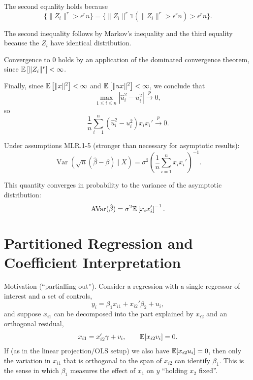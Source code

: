 \begin{remark}	The second equality holds because \[
		\{\|Z_i\|^r > \epsilon^r n\} = \{\|Z_i\|^r \mathds{1}(\|Z_i\|^r > \epsilon^r n) > \epsilon^r n\}
	.\] 
	
	The second inequality follows by Markov's inequality and the third equality because the $Z_i$ have identical distribution.
	
	Convergence to $0$ holds by an application of the dominated convergence theorem, since $\mathbb{E}\left[\|Z_i\|^r\right] < \infty$.
	
	Finally, since $\mathbb{E}\left[\|x\|^2\right] < \infty$ and $\mathbb{E}\left[\|ux\|^2\right] < \infty$, we conclude that \[
		\max_{1 \le i \le n} |\hat{u}_i^2 - u_i^2| \xrightarrow{p} 0
	,\] so \[
		\frac{1}{n} \sum_{i=1}^{n} (\hat{u}_i^2 - u_i^2) x_i x_i' \xrightarrow{p} 0
	.\] 
\end{remark}

\begin{remark}
	Under assumptions MLR.1-5 (stronger than necessary for asymptotic results): \[
		\operatorname{Var}\left( \sqrt{n} (\hat{\beta} - \beta) \mid X \right) = \sigma^2 \left( \frac{1}{n} \sum_{i=1}^{n} x_i x_i' \right)^{-1}
	.\] 
	
	This quantity converges in probability to the variance of the asymptotic distribution: \[
		\operatorname{AVar}(\hat{\beta}) = \sigma^2 \mathbb{E}\left[x_i x_i'\right] ^{-1}
	.\] 
\end{remark}

\section{Partitioned Regression and Coefficient Interpretation}

Motivation (``partialling out'').
Consider a regression with a single regressor of interest and a set of controls,
\[
	y_i = \beta_1 x_{i1} + x_{i2}'\beta_2 + u_i,
\]
and suppose $x_{i1}$ can be decomposed into the part explained by $x_{i2}$ and an orthogonal residual,
\[
	x_{i1} = x_{i2}'\gamma + v_i, \qquad \mathbb{E}[x_{i2} v_i] = 0.
\]
If (as in the linear projection/OLS setup) we also have $\mathbb{E}[x_{i2}u_i]=0$, then only the variation in $x_{i1}$ that is orthogonal to the span of $x_{i2}$ can identify $\beta_1$.
This is the sense in which $\beta_1$ measures the effect of $x_{1}$ on $y$ ``holding $x_2$ fixed''.

